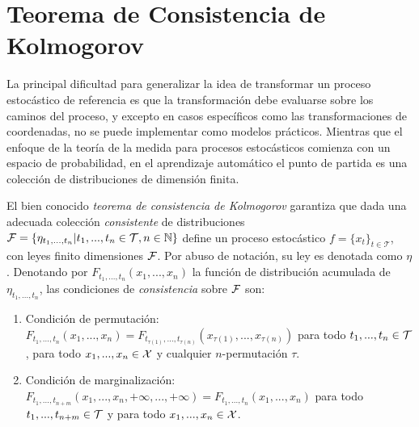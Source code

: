 \section{Teorema de Consistencia de Kolmogorov}

La principal dificultad para generalizar la idea de transformar un proceso estocástico de referencia es que la transformación debe evaluarse sobre los caminos del proceso, y excepto en casos específicos como las transformaciones de coordenadas, no se puede implementar como modelos prácticos. Mientras que el enfoque de la teoría de la medida para procesos estocásticos comienza con un espacio de probabilidad, en el aprendizaje automático el punto de partida es una colección de distribuciones de dimensión finita.


El bien conocido \emph{teorema de consistencia de Kolmogorov} \cite{tao2011introduction} garantiza que dada una adecuada colección \emph{consistente} de distribuciones \(\mathcal{F} = \{\eta_{t_{1},...,t_{n}}| t_{1},...,t_{n} \in \mathcal{T}, n\in \mathbb{N} \}\) define un proceso estocástico \(f=\{x_{t}\}_{t\in \mathcal{T}}\), con leyes finito dimensiones \(\mathcal{F}\). Por abuso de notación, su ley es denotada como \(\eta\). Denotando por \(F_{t_{1},...,t_{n}}(x_1,...,x_n)\) la función de distribución acumulada de \(\eta_{t_{1},...,t_{n}}\), las condiciones de \emph{consistencia}  sobre \(\mathcal{F}\) son:
\begin{enumerate}
	\item Condición de permutación: \(F_{t_{1},...,t_{n}}\left( x_{1},...,x_{n}\right) =F_{t_{\tau \left( 1\right)},...,t_{\tau \left( n\right) }}\left( x_{\tau \left( 1\right) },...,x_{\tau\left( n\right) }\right)\) para todo \(t_1,...,t_{n} \in \mathcal{T}\), para todo \(x_1,...,x_n \in \mathcal{X}\) y cualquier \(n\)-permutación \(\tau\).
	\item Condición de marginalización: \(F_{t_{1},...,t_{n+m}}\left( x_{1},...,x_{n},+\infty,...,+\infty \right) =F_{t_{1},...,t_{n}}\left( x_{1},...,x_{n}\right)\) para todo \(t_1,...,t_{n+m} \in \mathcal{T}\) y para todo \(x_1,...,x_n \in \mathcal{X}\).
\end{enumerate}

